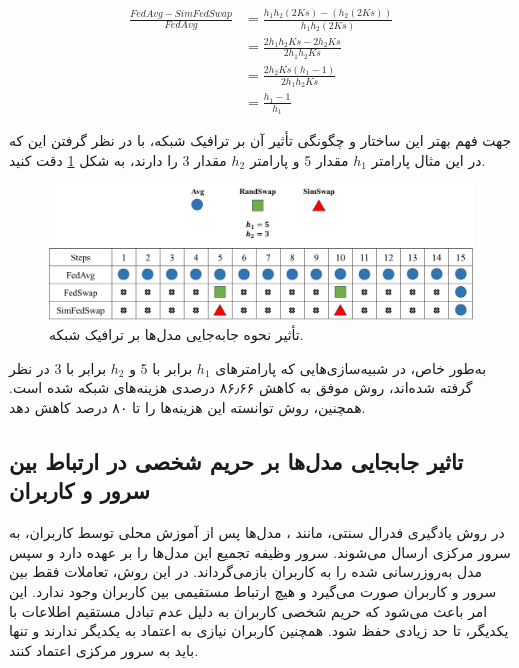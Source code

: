 \begingroup
\addtolength{\jot}{0.5em}
\begin{equation}
	\begin{aligned} 
		\frac{FedAvg-SimFedSwap}{FedAvg}
		&= \frac{h_1h_2(2Ks)-(h_2(2Ks))}{h_1h_2(2Ks)} \\
		&= \frac{2h_1h_2Ks-2h_2Ks}{2h_1h_2Ks} \\
		&= \frac{2h_2Ks(h_1 -1)}{2h_1h_2Ks} \\
		&= \frac{h_1 -1}{h_1}
	\end{aligned}
\end{equation}
\endgroup


جهت فهم بهتر این ساختار و چگونگی تأثیر آن بر ترافیک شبکه، با در نظر گرفتن این که در این مثال پارامتر \(h_1\) مقدار 5 و پارامتر \(h_2\) مقدار 3 را دارند، به شکل
\ref{compare_swap_net_traffic} 
دقت کنید.
\begin{figure}[b!]
	\centering
	\includegraphics[scale=0.3]{images/chap4/compare_swap_net_traffic.png}%
	\caption{%
		تأثیر نحوه جابه‌جایی مدل‌ها بر ترافیک شبکه.
	}
	\label{compare_swap_net_traffic}
	\centering
\end{figure}
به‌طور خاص، در شبیه‌سازی‌هایی که پارامترهای \(h_1\) برابر با 5 و \(h_2\) برابر با 3 در نظر گرفته شده‌اند، روش  موفق به کاهش
۸۶٫۶۶
درصدی هزینه‌های شبکه شده است. همچنین، روش  توانسته این هزینه‌ها را تا ۸۰ درصد کاهش دهد. 


\subsection{
	تاثیر جابجایی مدل‌ها بر حریم شخصی در ارتباط بین سرور و کاربران
}
در روش یادگیری فدرال سنتی، مانند
%
، مدل‌ها پس از آموزش محلی توسط کاربران، به سرور مرکزی ارسال می‌شوند. سرور وظیفه تجمیع این مدل‌ها را بر عهده دارد و سپس مدل به‌روزرسانی‌ شده را به کاربران بازمی‌گرداند. در این روش، تعاملات فقط بین سرور و کاربران صورت می‌گیرد و هیچ ارتباط مستقیمی بین کاربران وجود ندارد. این امر باعث می‌شود که حریم شخصی کاربران به دلیل عدم تبادل مستقیم اطلاعات با یکدیگر، تا حد زیادی حفظ شود. همچنین کاربران نیازی به اعتماد به یکدیگر ندارند و تنها باید به سرور مرکزی اعتماد کنند.

